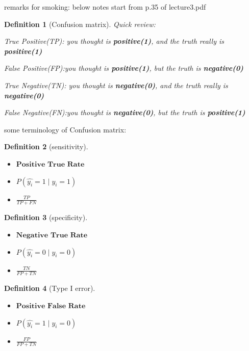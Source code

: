 \documentclass{article}
\theoremstyle{MyNonumberplain}
\theoremstyle{break}
\theoremstyle{break}
\theoremstyle{break}
\theoremstyle{break}
\newtheorem{definition}{Definition}[section]
\begin{document}
\newpage
remarks for smoking: below notes start from p.35 of lecture3.pdf 
\begin{defbox}
    \begin{definition}[Confusion matrix]
       
           Quick review:
           
            True Positive(TP): \quad you thought is \textbf{positive(1)}, and the truth really is \textbf{positive(1)}

            False Positive(FP):\quad you thought is \textbf{positive(1)}, but the truth is \textbf{negative(0)}

            True Negative(TN): \quad you thought is \textbf{negative(0)}, and the truth really is \textbf{negative(0)} 
            
            False Negative(FN):\quad you thought is \textbf{negative(0)}, but the truth is \textbf{positive(1)}        
    \end{definition}
\end{defbox}

some terminology of Confusion matrix:
\begin{defbox}
    \begin{definition}[sensitivity]
        \begin{itemize}
            below are things equivalent to sensitivity:
            \item $\textbf{Positive True Rate}$
            \item $P(\hat{y_i} = 1 \mid y_i = 1)$
            \item $\frac{TP}{TP + FN}$
        \end{itemize}
    \end{definition}
\end{defbox}

\begin{defbox}
    \begin{definition}[specificity]
        \begin{itemize}
            below are things equivalent to specificity:
            \item $\textbf{Negative True Rate}$
            \item $P(\hat{y_i} = 0 \mid y_i = 0)$
            \item $\frac{TN}{FP + TN}$
        \end{itemize}
    \end{definition}
\end{defbox}

\begin{defbox}
    \begin{definition}[Type I error]
        \begin{itemize}
            below are things equivalent to Type I error:
            \item $\textbf{Positive False Rate}$
            \item $P(\hat{y_i} = 1 \mid y_i = 0)$
            \item $\frac{FP}{FP + TN}$
        \end{itemize}
    \end{definition}
\end{defbox}
\end{document}
